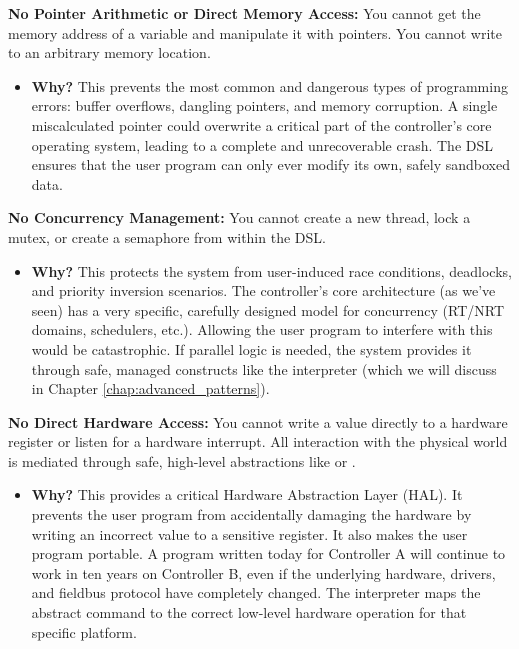 \textbf{No Pointer Arithmetic or Direct Memory Access:} You cannot get the memory address of a variable and manipulate it with pointers. You cannot write to an arbitrary memory location.
    \begin{itemize}
        \item \textbf{Why?} This prevents the most common and dangerous types of programming errors: buffer overflows, dangling pointers, and memory corruption. A single miscalculated pointer could overwrite a critical part of the controller's core operating system, leading to a complete and unrecoverable crash. The DSL ensures that the user program can only ever modify its own, safely sandboxed data.
    \end{itemize}

\textbf{No Concurrency Management:} You cannot create a new thread, lock a mutex, or create a semaphore from within the DSL.
    \begin{itemize}
        \item \textbf{Why?} This protects the system from user-induced race conditions, deadlocks, and priority inversion scenarios. The controller's core architecture (as we've seen) has a very specific, carefully designed model for concurrency (RT/NRT domains, schedulers, etc.). Allowing the user program to interfere with this would be catastrophic. If parallel logic is needed, the system provides it through safe, managed constructs like the  interpreter (which we will discuss in Chapter \ref{chap:advanced_patterns}).
    \end{itemize}

\textbf{No Direct Hardware Access:} You cannot write a value directly to a hardware register or listen for a hardware interrupt. All interaction with the physical world is mediated through safe, high-level abstractions like  or .
    \begin{itemize}
        \item \textbf{Why?} This provides a critical Hardware Abstraction Layer (HAL). It prevents the user program from accidentally damaging the hardware by writing an incorrect value to a sensitive register. It also makes the user program portable. A program written today for Controller A will continue to work in ten years on Controller B, even if the underlying hardware, drivers, and fieldbus protocol have completely changed. The interpreter maps the abstract  command to the correct low-level hardware operation for that specific platform.
    \end{itemize}



